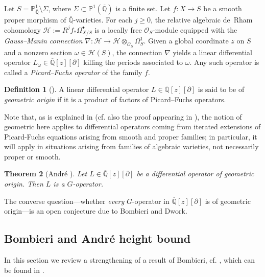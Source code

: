 \documentclass[10pt]{article}
\numberwithin{equation}{section}
\theoremstyle{plain}
\newtheorem{thm}{Theorem}[section]
\theoremstyle{definition}
\newtheorem{defn}[thm]{Definition}
\theoremstyle{remark}
\newcommand{\Qbar}{\overline{\mathbb{Q}}}
\begin{document}
Let $S = \mathbb{P}^1_{\Qbar} \setminus \Sigma$, where $\Sigma \subset \mathbb{P}^1(\Qbar)$ is a finite set. Let $f: X \to S$ be a smooth proper morphism of $\Qbar$-varieties. For each $j \geq 0$, the relative algebraic de~Rham cohomology $\mathcal{H} := R^{j} f_{*} \Omega^{\bullet}_{X/S}$ is a locally free $\mathcal{O}_S$-module equipped with the \emph{Gauss–Manin connection} $\nabla: \mathcal{H} \to \mathcal{H} \otimes_{\mathcal{O}_S} \Omega^1_{S}$. Given a global coordinate $z$ on $S$ and a nonzero section $\omega \in \mathcal{H}(S)$, the connection $\nabla$ yields a linear differential operator $L_\omega \in \Qbar[z][\partial]$ killing the periods associated to $\omega$. Any such operator is called a \emph{Picard–Fuchs operator} of the family $f$.



\begin{defn}[{\cite[Ch. II, Def. 1.3]{zbMATH00041964}}]
\label{defn:geometric-origin}
A linear differential operator $L \in \Qbar[z][\partial]$ is said to be of \emph{geometric origin} if it is a product of factors of Picard–Fuchs operators. 
\end{defn}

Note that, as is explained in \cite[Ch. II]{zbMATH00041964} (cf. also the proof appearing in \cite[Ch. V, App.]{zbMATH00041964}), the notion of geometric here applies to differential operators coming from iterated extensions of Picard-Fuchs equations arising from smooth and proper families; in particular, it will apply in situations arising from families of algebraic varieties, not necessarily proper or smooth.



\begin{thm}[André {\cite[Ch. V, App.]{zbMATH00041964}}]
\label{thm:andre-geometric}
Let $L \in \overline{\mathbb{Q}}[z][\partial]$ be a differential operator of geometric origin. Then $L$ is a $G$-operator. 
\end{thm}


The converse question—whether \emph{every} $G$-operator in $\overline{\mathbb{Q}}[z][\partial]$ is of geometric origin—is an open conjecture due to Bombieri and Dwork.


\subsection{Bombieri and André height bound}

In this section we review a strengthening of a result of Bombieri, cf. \cite[\S11, \S12]{zbMATH03721021}, which can be found in \cite[VII, Sec. 4.3] {zbMATH00041964}.
\end{document}
